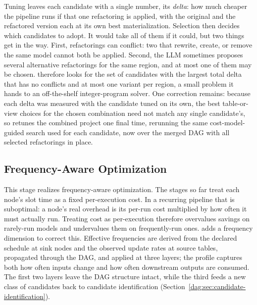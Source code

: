 Tuning leaves each candidate with a single number, its \emph{delta}: how much cheaper the pipeline runs if that one refactoring is applied, with the original and the refactored version each at its own best materialization. Selection then decides which candidates to adopt. It would take all of them if it could, but two things get in the way. First, refactorings can conflict: two that rewrite, create, or remove the same model cannot both be applied. Second, the LLM sometimes proposes several alternative refactorings for the same region, and at most one of them may be chosen. \dagsmith{} therefore looks for the set of candidates with the largest total delta that has no conflicts and at most one variant per region, a small problem it hands to an off-the-shelf integer-program solver. One correction remains: because each delta was measured with the candidate tuned on its own, the best table-or-view choices for the chosen combination need not match any single candidate's, so \dagsmith{} retunes the combined project one final time, rerunning the same cost-model-guided search used for each candidate, now over the merged DAG with all selected refactorings in place. 





\subsection{Frequency-Aware Optimization}
\label{dag:sec:frequency}

This stage realizes frequency-aware optimization. The stages so far treat each node's slot time as a fixed per-execution cost. In a recurring pipeline that is suboptimal: a node's real overhead is its per-run cost multiplied by how often it must actually run. Treating cost as per-execution therefore overvalues savings on rarely-run models and undervalues them on frequently-run ones. \dagsmith{} adds a frequency dimension to correct this. Effective frequencies are derived from the declared schedule at sink nodes and the observed update rates at source tables, propagated through the DAG, and applied at three layers;  the profile captures both how often inputs change and how often downstream outputs are consumed.  The first two layers leave the DAG structure intact, while the third feeds a new class of candidates back to candidate identification (Section~\ref{dag:sec:candidate-identification}).


